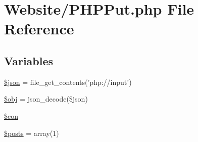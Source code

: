 \hypertarget{_p_h_p_put_8php}{\section{Website/\-P\-H\-P\-Put.php File Reference}
\label{_p_h_p_put_8php}
}
\subsection*{Variables}
\begin{DoxyCompactItemize}
\item 
\hyperlink{_p_h_p_put_8php_acedd13b51401130848ce18f4d5c52605}{\$json} = file\-\_\-get\-\_\-contents('php\-://input')
\item 
\hyperlink{_p_h_p_put_8php_a9008ed94ba185855b1723e367744b87e}{\$obj} = json\-\_\-decode(\$json)
\item 
\hyperlink{_p_h_p_put_8php_a0debe10448ec56a57b5509648408a549}{\$con}
\item 
\hyperlink{_p_h_p_put_8php_a9f4cad5a721e7f7711fba0bf0f7ec273}{\$posts} = array(1)
\end{DoxyCompactItemize}



